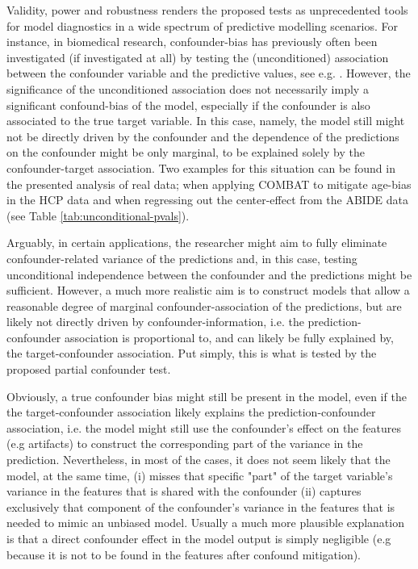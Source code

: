 \documentclass{article}
\begin{document}
Validity, power and robustness renders the proposed tests as unprecedented tools for model diagnostics in a wide spectrum of predictive modelling scenarios.
For instance, in biomedical research, confounder-bias has previously often been investigated (if investigated at all) by testing the (unconditioned) association between the confounder variable and the predictive values, see e.g. \citep{spisak2020pain}. However, the significance of the unconditioned association does not necessarily imply a significant confound-bias of the model, especially if the confounder is also associated to the true target variable. In this case, namely, the model still might not be directly driven by the confounder and the dependence of the predictions on the confounder might be only marginal, to be explained solely by the confounder-target association. 
Two examples for this situation can be found in the presented analysis of real data; when applying COMBAT to mitigate age-bias in the HCP data and when regressing out the center-effect from the ABIDE data (see Table \ref{tab:unconditional-pvals}).

Arguably, in certain applications, the researcher might aim to fully eliminate confounder-related variance of the predictions and, in this case, testing unconditional independence between the confounder and the predictions might be sufficient. However, a much more realistic aim is to construct models that allow a reasonable degree of marginal confounder-association of the predictions, but are likely not directly driven by confounder-information, i.e. the prediction-confounder association is proportional to, and can likely be fully explained by, the target-confounder association.
Put simply, this is what is tested by the proposed partial confounder test.

Obviously, a true confounder bias might still be present in the model, even if the the target-confounder association likely explains the prediction-confounder association, i.e. the model might still use the confounder's effect on the features (e.g artifacts) to construct the corresponding part of the variance in the prediction. Nevertheless, in most of the cases, it does not seem likely that the model, at the same time, (i) misses that specific "part" of the target variable's variance in the features that is shared with the confounder (ii) captures exclusively that component of the confounder's variance in the features that is needed to mimic an unbiased model.
Usually a much more plausible explanation is that a direct confounder effect in the model output is simply negligible (e.g because it is not to be found in the features after confound mitigation).
\end{document}
